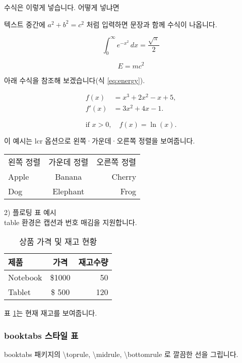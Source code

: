 수식은 이렇게 넣습니다. 어떻게 넣냐면

텍스트 중간에 $a^2 + b^2 = c^2$ 처럼 입력하면 문장과 함께 수식이 나옵니다. 

\[ 
  \int_{0}^{\infty} e^{-x^2} \,dx = \frac{\sqrt{\pi}}{2}
\]

\begin{equation}
  E = mc^2
\end{equation}

아래 수식을 참조해 보겠습니다(식 \ref{eq:energy}).

\begin{align}
  f(x) &= x^3 + 2x^2 - x + 5, \label{eq:energy}\\
  f'(x) &= 3x^2 + 4x - 1.
\end{align}

\[
  \text{if } x > 0, \quad f(x) = \ln(x).
\]


이 예시는 lcr 옵션으로 왼쪽·가운데·오른쪽 정렬을 보여줍니다.\par
\begin{tabular}{lcr}
  왼쪽 정렬 & 가운데 정렬 & 오른쪽 정렬 \\
  Apple     & Banana     & Cherry        \\
  Dog       & Elephant   & Frog          \\
\end{tabular}

2) 플로팅 표 예시\\
table 환경은 캡션과 번호 매김을 지원합니다.

\begin{table}[ht]
  \centering
  \begin{tabular}{|l|c|r|}
    \hline
    제품      & 가격    & 재고수량 \\ \hline
    Notebook & \$1000 & 50       \\ \hline
    Tablet   & \$ 500 & 120      \\ \hline
  \end{tabular}
  \caption{상품 가격 및 재고 현황} \label{tab:inventory}
\end{table}

표 \ref{tab:inventory}는 현재 재고를 보여줍니다.\par

\subsubsection{booktabs 스타일 표}
booktabs 패키지의 \textbackslash toprule, \textbackslash midrule,  \textbackslash bottomrule 로 깔끔한 선을 그립니다.

